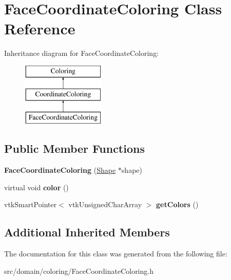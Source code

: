 \hypertarget{class_face_coordinate_coloring}{}\section{Face\+Coordinate\+Coloring Class Reference}
\label{class_face_coordinate_coloring}
Inheritance diagram for Face\+Coordinate\+Coloring\+:\begin{figure}[H]
\begin{center}
\leavevmode
\includegraphics[height=3.000000cm]{class_face_coordinate_coloring}
\end{center}
\end{figure}
\subsection*{Public Member Functions}
\begin{DoxyCompactItemize}
\item 
\hypertarget{class_face_coordinate_coloring_a4fc5101b5447c9ac5f4ea293ed389d11}{}{\bfseries Face\+Coordinate\+Coloring} (\hyperlink{class_shape}{Shape} $\ast$shape)\label{class_face_coordinate_coloring_a4fc5101b5447c9ac5f4ea293ed389d11}

\item 
\hypertarget{class_face_coordinate_coloring_a23935c52a6d31a017e8fb3e17c144cb5}{}virtual void {\bfseries color} ()\label{class_face_coordinate_coloring_a23935c52a6d31a017e8fb3e17c144cb5}

\item 
\hypertarget{class_face_coordinate_coloring_a45397f5e7e5910df62be4c8d7cfeaf8a}{}vtk\+Smart\+Pointer$<$ vtk\+Unsigned\+Char\+Array $>$ {\bfseries get\+Colors} ()\label{class_face_coordinate_coloring_a45397f5e7e5910df62be4c8d7cfeaf8a}

\end{DoxyCompactItemize}
\subsection*{Additional Inherited Members}


The documentation for this class was generated from the following file\+:\begin{DoxyCompactItemize}
\item 
src/domain/coloring/Face\+Coordinate\+Coloring.\+h\end{DoxyCompactItemize}
